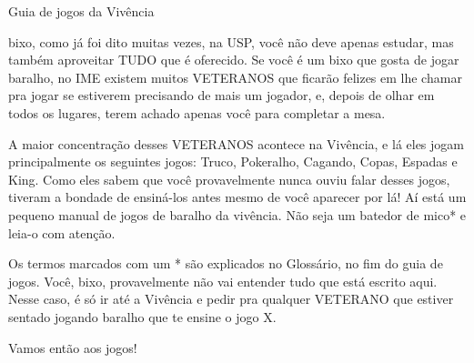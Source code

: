 \begin{secao}{Guia de jogos da Vivência }

bixo, como já foi dito muitas vezes, na USP, você não deve apenas estudar, mas
também aproveitar TUDO que é oferecido. Se você é um bixo que gosta de jogar
baralho, no IME existem muitos VETERANOS que ficarão felizes em lhe chamar pra
jogar se estiverem precisando de mais um jogador, e, depois de olhar em todos
os lugares, terem achado apenas você para completar a mesa. 

A maior concentração desses VETERANOS acontece na Vivência, e lá eles jogam
principalmente os seguintes jogos: Truco, Pokeralho, Cagando, Copas, Espadas e
King. Como eles sabem que você provavelmente nunca ouviu falar desses jogos,
tiveram a bondade de ensiná-los antes mesmo de você aparecer por lá! Aí está um
pequeno manual de jogos de baralho da vivência. Não seja um batedor de mico* e
leia-o com atenção. 

Os termos marcados com um * são explicados no Glossário, no fim do guia de
jogos. Você, bixo, provavelmente não vai entender tudo que está escrito aqui.
Nesse caso, é só ir até a Vivência e pedir pra qualquer VETERANO que estiver
sentado jogando baralho que te ensine o jogo X.

Vamos então aos jogos!









\end{secao}
